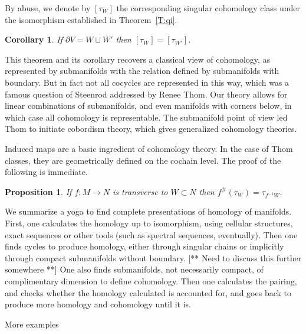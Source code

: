 \documentclass{amsart}          %
\newtheorem{corollary}[theorem]{Corollary}
\newtheorem{proposition}[theorem]{Proposition}
\begin{document}
By abuse, we denote by $[\tau_{W}]$ the corresponding singular cohomology class under the isomorphism established in Theorem~\ref{T:qi}.

\begin{corollary}
If $\partial V = W \sqcup W'$ then $[\tau_W] = [\tau_{W'}]$.
\end{corollary}

This theorem and its
corollary recovers a classical view of cohomology, as represented by 
submanifolds with the relation defined by submanifolds with boundary.  But in fact
not all cocycles are represented in this way, which was a famous question of Steenrod addressed by Renee Thom.  
Our theory allows for linear combinations
of submanifolds, and even manifolds with corners below, in which case all cohomology is representable.  
The submanifold point of view led Thom
to initiate cobordism theory, which gives generalized cohomology theories.



Induced maps are a basic ingredient of cohomology theory.  
In the case of Thom classes, they are geometrically defined on the cochain level.  The
proof of the following is immediate.

\begin{proposition}\label{pullback}
If $f : M \to N$ is transverse to $W \subset N$ then $f^{\#}(\tau_{W}) = \tau_{f^{-1} W}$.
\end{proposition}

We summarize a yoga to find complete presentations of homology of manifolds.
First, one calculates the homology up to isomorphism, using cellular structures, exact sequences or other tools
(such as spectral sequences, eventually).  Then one finds  cycles to produce homology, either through singular chains
or implicitly through compact submanifolds without boundary.  [** Need to discuss this further somewhere **]   One
also finds submanifolds, not necessarily compact, of complimentary dimension to define cohomology.  Then one
calculates the pairing, and checks whether the homology calculated is accounted for, and goes back to produce more homology
and cohomology until it is.


More examples
\end{document}
